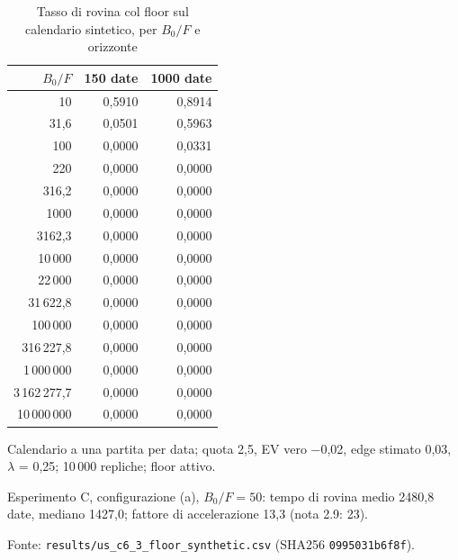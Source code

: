 \begin{table}[htbp]
\centering
\small
\caption{Tasso di rovina col floor sul calendario sintetico, per $B_0/F$ e orizzonte}
\label{tab:c6_3_floor_sintetico}
\begin{tabular}{rrr}
\toprule
$B_0/F$ & 150 date & 1000 date \\
\midrule
10 & 0,5910 & 0,8914 \\
31,6 & 0,0501 & 0,5963 \\
100 & 0,0000 & 0,0331 \\
220 & 0,0000 & 0,0000 \\
316,2 & 0,0000 & 0,0000 \\
1000 & 0,0000 & 0,0000 \\
3162,3 & 0,0000 & 0,0000 \\
10\,000 & 0,0000 & 0,0000 \\
22\,000 & 0,0000 & 0,0000 \\
31\,622,8 & 0,0000 & 0,0000 \\
100\,000 & 0,0000 & 0,0000 \\
316\,227,8 & 0,0000 & 0,0000 \\
1\,000\,000 & 0,0000 & 0,0000 \\
3\,162\,277,7 & 0,0000 & 0,0000 \\
10\,000\,000 & 0,0000 & 0,0000 \\
\bottomrule
\end{tabular}

\smallskip
\begin{minipage}{\linewidth}
\footnotesize
Calendario a una partita per data; quota 2,5, EV vero $-$0,02, edge stimato 0,03, $\lambda$ = 0,25; 10\,000 repliche; floor attivo.\par
Esperimento C, configurazione (a), $B_0/F = 50$: tempo di rovina medio 2480,8 date, mediano 1427,0; fattore di accelerazione 13,3 (nota 2.9: 23).\par
Fonte: \texttt{results/us\_c6\_3\_floor\_synthetic.csv} (SHA256 \texttt{0995031b6f8f}).
\end{minipage}
\end{table}
